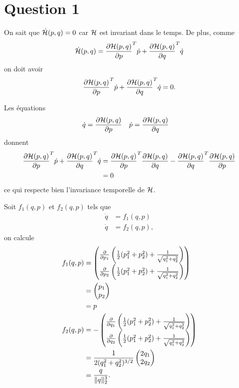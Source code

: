 \section*{Question 1}
On sait que $\dot{\mathcal{H}}(p,q) = 0$ car $\mathcal{H}$ est invariant dans le temps.
De plus, comme
\[
  \dot{\mathcal{H}}(p,q) = \frac{\partial \mathcal{H}(p,q)}{\partial p}^T\dot{p} + \frac{\partial \mathcal{H}(p,q)}{\partial q}^T\dot{q}
\]
on doit avoir
\[
  \frac{\partial \mathcal{H}(p,q)}{\partial p}^T\dot{p} + \frac{\partial \mathcal{H}(p,q)}{\partial q}^T\dot{q} = 0.
\]

Les équations
\begin{align*}
  \dot{q} & = \frac{\partial \mathcal{H}(p,q)}{\partial p} & \dot{p} & = \frac{\partial \mathcal{H}(p,q)}{\partial q}
\end{align*}
donnent
\begin{align*}
  \frac{\partial \mathcal{H}(p,q)}{\partial p}^T\dot{p} + \frac{\partial \mathcal{H}(p,q)}{\partial q}^T\dot{q} & =
  \frac{\partial \mathcal{H}(p,q)}{\partial p}^T\frac{\partial \mathcal{H}(p,q)}{\partial q} - \frac{\partial \mathcal{H}(p,q)}{\partial q}^T\frac{\partial \mathcal{H}(p,q)}{\partial p}\\
  & = 0
\end{align*}
ce qui respecte bien l'invariance temporelle de $\mathcal{H}$.

Soit $f_1(q,p)$ et $f_2(q,p)$ tels que
\begin{align*}
  \dot{q} & = f_1(q,p)\\
  \dot{q} & = f_2(q,p),
\end{align*}
on calcule
\begin{align*}
  f_1(q,p) & =
  \begin{pmatrix}
    \fpart{}{p_1} \left(\frac{1}{2}(p_1^2 + p_2^2) + \frac{1}{\sqrt{q_1^2 + q_2^2}}\right)\\
    \fpart{}{p_2} \left(\frac{1}{2}(p_1^2 + p_2^2) + \frac{1}{\sqrt{q_1^2 + q_2^2}}\right)
  \end{pmatrix}\\
  & =
  \begin{pmatrix}
    p_1\\
    p_2
  \end{pmatrix}\\
  & = p\\
%
  f_2(q,p) & =
  -\begin{pmatrix}
    \fpart{}{q_1} \left(\frac{1}{2}(p_1^2 + p_2^2) + \frac{1}{\sqrt{q_1^2 + q_2^2}}\right)\\
    \fpart{}{q_2} \left(\frac{1}{2}(p_1^2 + p_2^2) + \frac{1}{\sqrt{q_1^2 + q_2^2}}\right)
  \end{pmatrix}\\
  & =
  \frac{1}{2(q_1^2 + q_2^2)^{3/2}}
  \begin{pmatrix}
    2q_1\\
    2q_2
  \end{pmatrix}\\
  & = \frac{q}{\|q\|_2^3}.
\end{align*}

